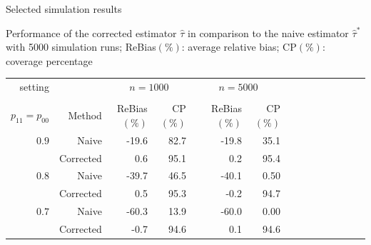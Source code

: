 \documentclass[12pt,aspectratio=169]{beamer}
\begin{document}
\begin{frame}{Selected simulation results}

{\small Performance of  the corrected estimator $\hat\tau$  in comparison to the naive estimator $\hat\tau^\ast$ with 5000 simulation runs; ReBias$(\%)$: average relative bias; CP$(\%)$:  coverage percentage}

\begin{table}[t]
\begin{center}
\begin{tabular}{rrrrrrrrrrrrrrr}
\toprule
  setting    && \multicolumn{2}{c}{$n=1000$} &\multicolumn{3}{c}{$n=5000$}\\
\cline{3-4}     \cline{6-7} \\
$p_{11}=p_{00}$    &Method  & ReBias$(\%)$  &CP$(\%)$&& ReBias$(\%)$  &CP$(\%)$   \\ 
  \hline
$0.9$&Naive  & -19.6   &82.7&&-19.8    &35.1 \\
\vspace{2mm}

\cellcolor{blueHL}
&\cellcolor{blueHL}Corrected & \cellcolor{blueHL}0.6    &\cellcolor{blueHL}95.1& \cellcolor{blueHL} &\cellcolor{blueHL} 0.2 &\cellcolor{blueHL} 95.4  \\
$0.8$&Naive     &-39.7& 46.5 &   & -40.1  &0.50 \\
\vspace{2mm}

\cellcolor{blueHL}
&\cellcolor{blueHL}Corrected &  \cellcolor{blueHL}0.5   &\cellcolor{blueHL}95.3& \cellcolor{blueHL}&  \cellcolor{blueHL}-0.2& \cellcolor{blueHL}94.7  \\
$0.7$&Naive     &-60.3     &13.9&& -60.0   &0.00\\
 
 \cellcolor{blueHL}
&\cellcolor{blueHL}Corrected  & \cellcolor{blueHL}-0.7  &\cellcolor{blueHL}94.6&\cellcolor{blueHL}& \cellcolor{blueHL}0.1  &\cellcolor{blueHL}94.6  \\
\bottomrule
\end{tabular}
\end{center}
\end{table}

\end{frame}
\end{document}
